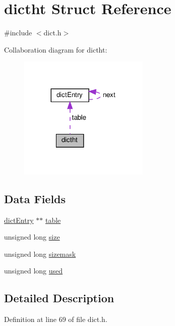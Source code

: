 \hypertarget{structdictht}{}\section{dictht Struct Reference}
\label{structdictht}


{\ttfamily \#include $<$dict.\+h$>$}



Collaboration diagram for dictht\+:
\nopagebreak
\begin{figure}[H]
\begin{center}
\leavevmode
\includegraphics[width=176pt]{structdictht__coll__graph}
\end{center}
\end{figure}
\subsection*{Data Fields}
\begin{DoxyCompactItemize}
\item 
\hyperlink{structdict_entry}{dict\+Entry} $\ast$$\ast$ \hyperlink{structdictht_aa1d81eae7b1831354fd3e941a6c1192b}{table}
\item 
unsigned long \hyperlink{structdictht_a1e1268d164c38e4f8a4f4eb9058b0601}{size}
\item 
unsigned long \hyperlink{structdictht_aa2d44ea57263c4ae782cbbff2a131f2b}{sizemask}
\item 
unsigned long \hyperlink{structdictht_abeece48b2d7c09bffa9101df617478d0}{used}
\end{DoxyCompactItemize}


\subsection{Detailed Description}


Definition at line 69 of file dict.\+h.



